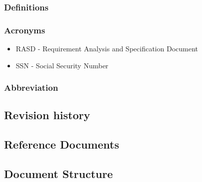 \subsubsection{Definitions}
\subsubsection{Acronyms}
\begin{itemize}
    \item RASD - Requirement Analysis and Specification Document 
    \item SSN - Social Security Number
\end{itemize}
\subsubsection{Abbreviation}

\subsection{Revision history}
\subsection{Reference Documents}
\subsection{Document Structure}

